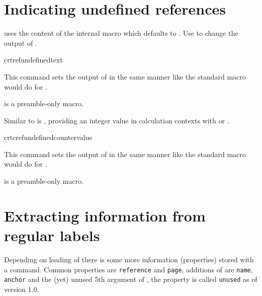 \documentclass[12pt,a4paper,oneside]{article}
\makeatletter
\newcommand{\chdocextractversion}[1]{%
  \@nameuse{#1}%
}
\def\packageversion{1.0}
\newcommand{\PackageDocName}{crossreftools}%
\makeatother
\begin{document}
\parttoc

\section{Indicating undefined references}

\CHDocPackage{\PackageDocName} uses the content of the internal macro  which defaults to \makeatletter\crt@refundefined\makeatother. 
Use  to change the output of .

\begin{docCommand}[doc new={\chdocextractversion{crossreftoolsversion0.4}}]{crtrefundefinedtext}{}


This command sets the output of  in the same manner like the standard macro  would do for . 

\begin{marker}
   is a preamble-only macro. 
\end{marker}
\end{docCommand}


Similar to  is , providing an integer value in calculation contexts with  or . 

\begin{docCommand}[doc new={\chdocextractversion{crossreftoolsversion0.4}}]{crtcrefundefinedcountervalue}{}


This command sets the output of  in the same manner like the standard macro  would do for . 

\begin{marker}
   is a preamble-only macro. 
\end{marker}
\end{docCommand}


\section{Extracting information from regular labels}\label{section:extractingregularlabels}

Depending on loading of  there is some more information (properties) stored with a  command. Common properties are \texttt{reference} and \texttt{page}, additions of  are \texttt{name}, \texttt{anchor} and the (yet) unused 5th argument of , the property is called \texttt{unused} as of version \packageversion.
\end{document}
